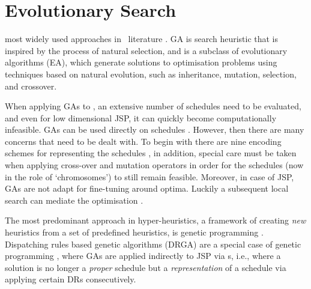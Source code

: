 

\chapter{Evolutionary Search}\label{ch:esmodels} 

 most widely used 
approaches in \JSP\ literature \citep{Pinedo08}. 
GA is search heuristic that is inspired by the process of natural selection, 
and is a subclass of evolutionary algorithms (EA), which generate solutions to 
optimisation problems using techniques based on natural evolution, such as 
inheritance, mutation, selection, and crossover.

When applying GAs to \JSP, an extensive number of schedules need to be 
evaluated, and even for low dimensional JSP, it can quickly become 
computationally infeasible. GAs can be used directly on schedules 
\citep{Cheng96,Cheng99,Tsai07,Qing-dao-er-ji12,Ak12}. 
However, then there are many concerns that need to be dealt with. 
To begin with there are nine encoding schemes for representing the schedules 
\citep{Cheng96}, in addition, special care must be taken when applying 
cross-over and mutation operators in order for the schedules (now in the role 
of `chromosomes') to still remain feasible. 
Moreover, in case of JSP, GAs are not adapt for fine-tuning around optima. 
Luckily a subsequent local search can mediate the optimisation 
\citep{Cheng99,Meeran12}.

The most predominant approach in hyper-heuristics, a framework of creating 
\emph{new} heuristics from a set of  predefined heuristics, is genetic 
programming \citep{Burke10}. Dispatching rules based genetic algorithms (DRGA) 
\citep{Vazquez-Rodriguez09,Dhingra10,Nguyen13} are a special case of genetic 
programming \citep{Koza05}, where GAs are applied indirectly to JSP via 
\dr s, i.e., where a solution is no longer a \emph{proper} schedule 
but a \emph{representation} of a schedule via applying certain DRs 
consecutively. 

